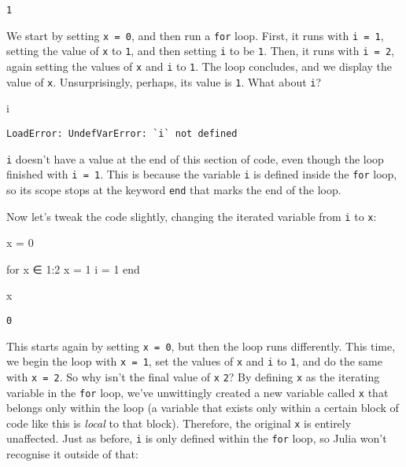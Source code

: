 \documentclass[
  letterpaper,
  DIV=11,
  numbers=noendperiod]{scrreprt}
\newenvironment{Shaded}{\begin{snugshade}}{\end{snugshade}}
\newcommand{\ControlFlowTok}[1]{\textcolor[rgb]{0.00,0.23,0.31}{#1}}
\newcommand{\FloatTok}[1]{\textcolor[rgb]{0.68,0.00,0.00}{#1}}
\newcommand{\NormalTok}[1]{\textcolor[rgb]{0.00,0.23,0.31}{#1}}
\newcommand{\OperatorTok}[1]{\textcolor[rgb]{0.37,0.37,0.37}{#1}}
\begin{document}
\begin{verbatim}
1
\end{verbatim}

We start by setting \texttt{x\ =\ 0}, and then run a \texttt{for} loop.
First, it runs with \texttt{i\ =\ 1}, setting the value of \texttt{x} to
\texttt{1}, and then setting \texttt{i} to be \texttt{1}. Then, it runs
with \texttt{i\ =\ 2}, again setting the values of \texttt{x} and
\texttt{i} to \texttt{1}. The loop concludes, and we display the value
of \texttt{x}. Unsurprisingly, perhaps, its value is \texttt{1}. What
about \texttt{i}?

\begin{Shaded}
\begin{Highlighting}[]
\NormalTok{i}
\end{Highlighting}
\end{Shaded}

\begin{verbatim}
LoadError: UndefVarError: `i` not defined
\end{verbatim}

\texttt{i} doesn't have a value at the end of this section of code, even
though the loop finished with \texttt{i\ =\ 1}. This is because the
variable \texttt{i} is defined inside the \texttt{for} loop, so its
scope stops at the keyword \texttt{end} that marks the end of the loop.

Now let's tweak the code slightly, changing the iterated variable from
\texttt{i} to \texttt{x}:

\begin{Shaded}
\begin{Highlighting}[]
\NormalTok{x }\OperatorTok{=} \FloatTok{0}

\ControlFlowTok{for}\NormalTok{ x }\OperatorTok{∈} \FloatTok{1}\OperatorTok{:}\FloatTok{2}
\NormalTok{    x }\OperatorTok{=} \FloatTok{1}
\NormalTok{    i }\OperatorTok{=} \FloatTok{1}
\ControlFlowTok{end}

\NormalTok{x}
\end{Highlighting}
\end{Shaded}

\begin{verbatim}
0
\end{verbatim}

This starts again by setting \texttt{x\ =\ 0}, but then the loop runs
differently. This time, we begin the loop with \texttt{x\ =\ 1}, set the
values of \texttt{x} and \texttt{i} to \texttt{1}, and do the same with
\texttt{x\ =\ 2}. So why isn't the final value of \texttt{x} \texttt{2}?
By defining \texttt{x} as the iterating variable in the \texttt{for}
loop, we've unwittingly created a new variable called \texttt{x} that
belongs only within the loop (a variable that exists only within a
certain block of code like this is \emph{local} to that block).
Therefore, the original \texttt{x} is entirely unaffected. Just as
before, \texttt{i} is only defined within the \texttt{for} loop, so
Julia won't recognise it outside of that:
\end{document}
